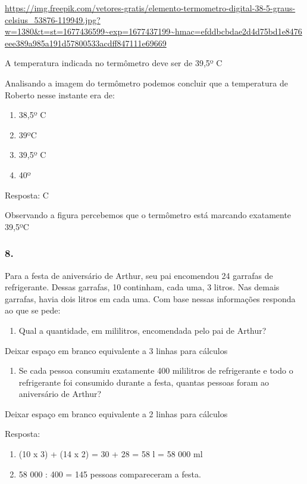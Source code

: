 \url{https://img.freepik.com/vetores-gratis/elemento-termometro-digital-38-5-graus-celsius_53876-119949.jpg?w=1380\&t=st=1677436599~exp=1677437199~hmac=efddbcbdae2d4d75bd1e8476eee389a985a191d57800533acdff847111e69669}

A temperatura indicada no termômetro deve ser de 39,5º C

Analisando a imagem do termômetro podemos concluir que a temperatura de
Roberto nesse instante era de:

\begin{enumerate}
\def\labelenumi{\alph{enumi})}
\item
  38,5º C
\item
  39ºC
\item
  39,5º C
\item
  40º
\end{enumerate}

Resposta: C

Observando a figura percebemos que o termômetro está marcando exatamente
39,5ºC

\subsubsection{8. }\label{section-58}

Para a festa de aniversário de Arthur, seu pai encomendou 24 garrafas de
refrigerante. Dessas garrafas, 10 continham, cada uma, 3 litros. Nas
demais garrafas, havia dois litros em cada uma. Com base nessas
informações responda ao que se pede:

\begin{enumerate}
\def\labelenumi{\alph{enumi})}
\item
  Qual a quantidade, em mililitros, encomendada pelo pai de Arthur?
\end{enumerate}

Deixar espaço em branco equivalente a 3 linhas para cálculos

\begin{enumerate}
\def\labelenumi{\alph{enumi})}
\item
  Se cada pessoa consumiu exatamente 400 mililitros de refrigerante e
  todo o refrigerante foi consumido durante a festa, quantas pessoas
  foram ao aniversário de Arthur?
\end{enumerate}

Deixar espaço em branco equivalente a 2 linhas para cálculos

Resposta:

\begin{enumerate}
\def\labelenumi{\alph{enumi})}
\item
  (10 x 3) + (14 x 2) = 30 + 28 = 58 l = 58 000 ml
\item
  58 000 : 400 = 145 pessoas compareceram a festa.
\end{enumerate}

